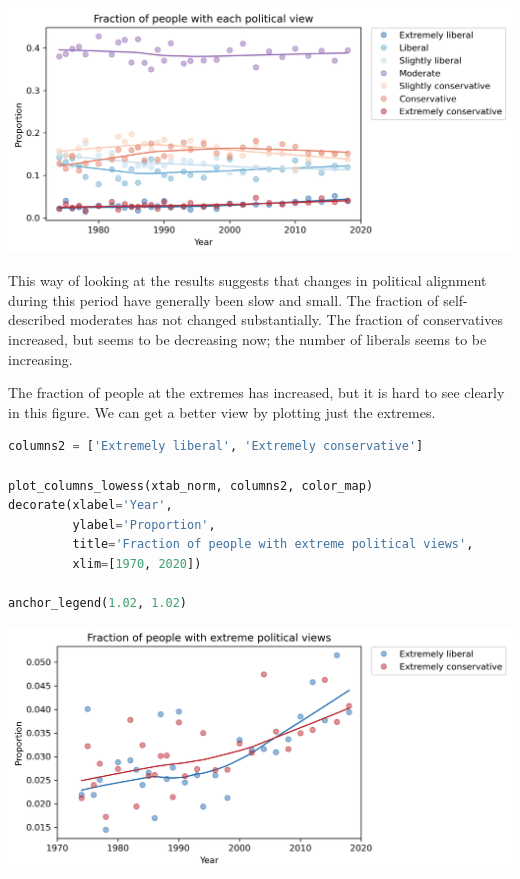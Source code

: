 \begin{center}
\includegraphics[scale=0.75]{02_polviews_soln_files/02_polviews_soln_91_0.png}
\end{center}

This way of looking at the results suggests that changes in political
alignment during this period have generally been slow and small. The
fraction of self-described moderates has not changed substantially. The
fraction of conservatives increased, but seems to be decreasing now; the
number of liberals seems to be increasing.

The fraction of people at the extremes has increased, but it is hard to
see clearly in this figure. We can get a better view by plotting just
the extremes.

\begin{lstlisting}[language=Python,style=source]
columns2 = ['Extremely liberal', 'Extremely conservative']

plot_columns_lowess(xtab_norm, columns2, color_map)
decorate(xlabel='Year',
         ylabel='Proportion',
         title='Fraction of people with extreme political views',
         xlim=[1970, 2020])

anchor_legend(1.02, 1.02)
\end{lstlisting}

\begin{center}
\includegraphics[scale=0.75]{02_polviews_soln_files/02_polviews_soln_93_0.png}
\end{center}

